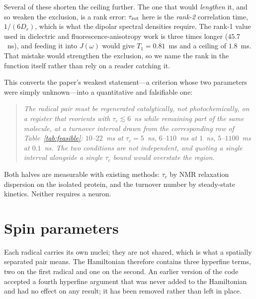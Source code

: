\documentclass[aps,prx,reprint,superscriptaddress,nofootinbib,floatfix]{revtex4-2}
\begin{document}
Several of these shorten the ceiling further. The one that would
\emph{lengthen} it, and so weaken the exclusion, is a rank error:
$\tau_{\rm rot}$ here is the \emph{rank-2} correlation time, $1/(6D_r)$, which is
what the dipolar spectral densities require. The rank-1 value used in dielectric
and fluorescence-anisotropy work is three times longer ($45.7$~ns), and feeding it
into $J(\omega)$ would give $T_1=0.81$~ms and a ceiling of $1.8$~ms. That mistake
would strengthen the exclusion, so we name the rank in the function itself rather
than rely on a reader catching it.

This converts the paper's weakest statement---a criterion whose two parameters
were simply unknown---into a quantitative and falsifiable one:

\begin{quote}
\emph{The radical pair must be regenerated catalytically, not photochemically, on
a register that reorients with $\tau_c\lesssim6$~ns while remaining part of the
same molecule, at a turnover interval drawn from the corresponding row of
Table~\ref{tab:feasible}: $10$--$22$~ms at $\tau_c=5$~ns, $6$--$110$~ms at
$1$~ns, $5$--$1100$~ms at $0.1$~ns. The two conditions are not independent, and
quoting a single interval alongside a single $\tau_c$ bound would overstate the
region.}
\end{quote}

Both halves are measurable with existing methods: $\tau_c$ by NMR relaxation
dispersion on the isolated protein, and the turnover number by steady-state
kinetics. Neither requires a neuron.

\section{Spin parameters}
\label{sec:params}
Each radical carries its own nuclei; they are not shared, which is what a spatially
separated pair means. The Hamiltonian therefore contains three hyperfine terms, two
on the first radical and one on the second. An earlier version of the code accepted a
fourth hyperfine argument that was never added to the Hamiltonian and had no effect on
any result; it has been removed rather than left in place.
\end{document}
